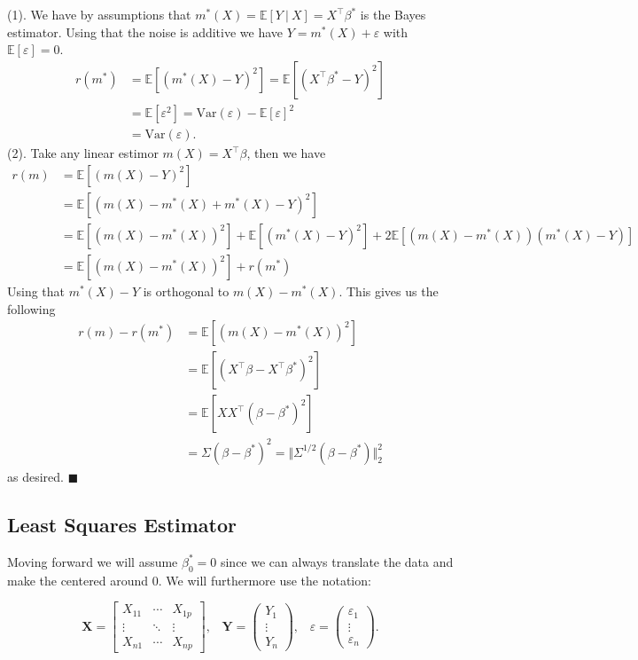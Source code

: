 \documentclass[
]{book}
\begin{document}
(1). We have by assumptions that \(m^*(X)=\mathbb E[Y\ \vert\ X]=X^\top\beta^*\) is the Bayes estimator. Using that the noise is additive we have \(Y=m^*(X)+\varepsilon\) with \(\mathbb E[\varepsilon]=0\).
\begin{align*}
r(m^*)&=\mathbb E[(m^*(X)-Y)^2]=\mathbb E[(X^\top\beta ^*-Y)^2]\\
&=\mathbb E[\varepsilon^2]=\text{Var}(\varepsilon)-\mathbb E[\varepsilon]^2\\
&=\text{Var}(\varepsilon).
\end{align*}
(2). Take any linear estimor \(m(X)=X^\top \beta\), then we have
\begin{align*}
r(m)&=\mathbb E[(m(X)-Y)^2]\\
&=\mathbb E[(m(X)-m^*(X)+m^*(X)-Y)^2]\\
&=\mathbb E[(m(X)-m^*(X))^2]+\mathbb E[(m^*(X)-Y)^2]+2\mathbb E[(m(X)-m^*(X))(m^*(X)-Y)]\\
&=\mathbb E[(m(X)-m^*(X))^2]+r(m^*)
\end{align*}
Using that \(m^*(X)-Y\) is orthogonal to \(m(X)-m^*(X)\). This gives us the following
\begin{align*}
r(m)- r(m^*)&=\mathbb E[(m(X)-m^*(X))^2]\\
&=\mathbb E[(X^\top \beta -X^\top \beta^*)^2]\\
&=\mathbb E[XX^\top(\beta-\beta^*)^2]\\
&=\Sigma(\beta-\beta^*)^2=\Vert \Sigma^{1/2}(\beta - \beta^*)\Vert ^2_2
\end{align*}
as desired. \(\blacksquare\)

\hypertarget{least-squares-estimator}{%
\subsection{Least Squares Estimator}\label{least-squares-estimator}}

Moving forward we will assume \(\beta_0^*=0\) since we can always translate the data and make the centered around 0. We will furthermore use the notation:

\[
\mathbf{X}=
\begin{bmatrix}
X_{11} & \cdots & X_{1p}\\
\vdots & \ddots & \vdots\\
X_{n1} & \cdots & X_{np}
\end{bmatrix},\hspace{10pt} \mathbf{Y}=
\begin{pmatrix}
Y_1\\
\vdots\\
Y_n
\end{pmatrix},\hspace{10pt} \varepsilon=
\begin{pmatrix}
\varepsilon_1\\
\vdots\\
\varepsilon_n
\end{pmatrix}.
\]
\end{document}

